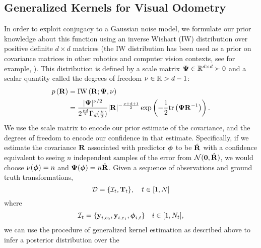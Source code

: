 


\subsection{Generalized Kernels for Visual Odometry}
In
order to exploit conjugacy to a Gaussian noise model, we formulate our prior knowledge
about this function using an inverse Wishart (IW) distribution over positive
definite $d \times d$ matrices (the IW distribution has been used as a prior on covariance matrices in other robotics and computer vision contexts, see for example, \citep{fitzgibbon2007learning}). This distribution is defined by a scale matrix
$\Matrix{\Psi} \in \RealNumbers[d][d]\succ0$ and a scalar quantity called the
degrees of freedom $\nu\in\RealNumbers>d-1$:
\begin{align}
  p\left(\boldsymbol{\mathbf{R}}\right) &= \text{IW}
  \left(\boldsymbol{\mathbf{R}}; \boldsymbol{\mathbf{\Psi}}, \nu\right)  \\ 
  &= \frac{\vert\boldsymbol{\mathbf{\Psi}}\vert^{\nu/2}}{2^{\frac{\nu
  d}{2}}\Gamma_d(\frac{\nu}{2})} \vert\boldsymbol{\mathbf{R}}\vert
  ^{-\frac{\nu+d+1}{2}} \exp\left( -\frac{1}{2} \text{tr}\left(\boldsymbol{\mathbf{\Psi}}
  \boldsymbol{\mathbf{R}}^{-1}\right)\right) \nonumber.
\end{align}
We use the scale matrix to encode our prior estimate of the
covariance, and the degrees of freedom to encode our confidence in
that estimate.  Specifically, if we estimate the covariance $\boldsymbol{\mathbf{R}}$
associated with predictor $\boldsymbol{\mathbf{\phi}}$ to be $\hat{\boldsymbol{\mathbf{R}}}$ with a
confidence equivalent to seeing $n$ independent samples of the error from
$\mathcal{N}(\boldsymbol{\mathbf{0}}, \hat{\boldsymbol{\mathbf{R}}})$, we would choose
$\nu(\boldsymbol{\mathbf{\phi}})=n$ and $\boldsymbol{\mathbf{\Psi}}(\boldsymbol{\mathbf{\phi}})=n\hat{\boldsymbol{\mathbf{R}}}$.
Given a sequence of observations and ground truth transformations,
\begin{equation}
\mathcal{D}=\{\mathcal{I}_t,\boldsymbol{\mathbf{T}}_t\},\quad t\in[1,N]
\end{equation} 
where
\begin{equation}
 \mathcal{I}_t = \{\boldsymbol{\mathbf{y}}_{i, c_0},
\boldsymbol{\mathbf{y}}_{i, c_1}, \boldsymbol{\mathbf{\phi}}_{i,t} \} \quad i\in[1,N_t],
\end{equation}
we can use the procedure of generalized kernel estimation as described above to infer a posterior distribution over the
